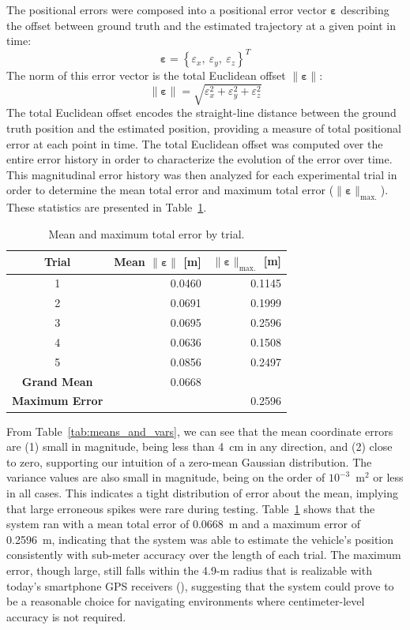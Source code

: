 The positional errors were composed into a positional error vector $\bm{\varepsilon}$ describing the offset between ground truth and the estimated trajectory at a given point in time:
%
\begin{equation}
\bm{\varepsilon} = \left\lbrace \varepsilon_{x},\ \varepsilon_{y},\ \varepsilon_{z} \right\rbrace ^{T}
\end{equation}
%
The norm of this error vector is the total Euclidean offset $\| \bm{\varepsilon} \|$:
%
\begin{equation}
\| \bm{\varepsilon} \| = \sqrt{\varepsilon_{x}^{2} + \varepsilon_{y}^{2} + \varepsilon_{z}^{2}} 
\end{equation}
%
The total Euclidean offset encodes the straight-line distance between the ground truth position and the estimated position, providing a measure of total positional error at each point in time. The total Euclidean offset was computed over the entire error history in order to characterize the evolution of the error over time. This magnitudinal error history was then analyzed for each experimental trial in order to determine the mean total error and maximum total error ($\| \bm{\varepsilon} \|_{\text{max.}}$). These statistics are presented in Table~\ref{tab:total_err}.

\begin{table}[h]\centering
\caption[Mean and Maximum Total Error]{Mean and maximum total error by trial.}
\begin{tabular}[c]{crr}
\toprule
Trial & Mean $\| \bm{\varepsilon} \|$ [m] & $\| \bm{\varepsilon} \|_{\text{max.}}$ [m] \\
\hline
1 & 0.0460 & 0.1145 \\
2 & 0.0691 & 0.1999 \\
3 & 0.0695 & 0.2596 \\
4 & 0.0636 & 0.1508 \\
5 & 0.0856 & 0.2497 \\
\hline
\textbf{Grand Mean} & 0.0668 \\
\hline
\textbf{Maximum Error} && 0.2596 \\
\bottomrule
\end{tabular}
\label{tab:total_err}
\end{table}

From Table~\ref{tab:means_and_vars}, we can see that the mean coordinate errors are (1) small in magnitude, being less than 4~cm in any direction, and (2) close to zero, supporting our intuition of a zero-mean Gaussian distribution. The variance values are also small in magnitude, being on the order of $10^{-3}$~m$^{2}$ or less in all cases. This indicates a tight distribution of error about the mean, implying that large erroneous spikes were rare during testing. Table~\ref{tab:total_err} shows that the system ran with a mean total error of 0.0668~m and a maximum error of 0.2596~m, indicating that the system was able to estimate the vehicle's position consistently with sub-meter accuracy over the length of each trial. The maximum error, though large, still falls within the 4.9-m radius that is realizable with today's smartphone GPS receivers (\cite{GpsGov}), suggesting that the system could prove to be a reasonable choice for navigating environments where centimeter-level accuracy is not required.